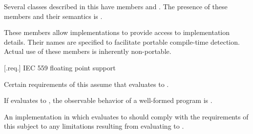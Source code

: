 \pnum
Several classes described in this \documenttypename{} have members 
 and . The presence of these 
members and their semantics is .
\begin{note}
These members allow implementations to provide access to implementation 
details. Their names are specified to facilitate portable compile-time 
detection. Actual use of these members is inherently non-portable.
\end{note}

 [\iotwod.req.\iecfivefivenine] {IEC 559 floating point support}

\pnum
Certain requirements of this \documenttypename{} assume that 
 evaluates to .

\pnum
If  evaluates to , the 
observable behavior of a well-formed program is \unspecnorm.
\begin{note}
An implementation in which  evaluates 
to  should comply with the requirements of this \documenttypename 
subject to any limitations resulting from 
 evaluating to .
\end{note}

%
